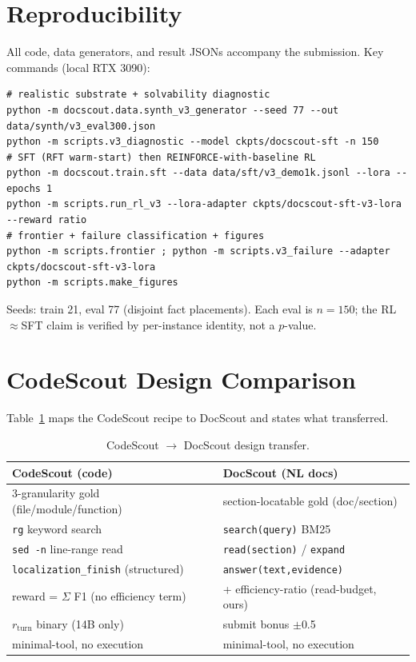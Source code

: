 \documentclass[10pt,twocolumn]{article}
\begin{document}
\section{Reproducibility}
\label{app:repro}
All code, data generators, and result JSONs accompany the submission. Key commands (local RTX 3090):
\begin{verbatim}
# realistic substrate + solvability diagnostic
python -m docscout.data.synth_v3_generator --seed 77 --out data/synth/v3_eval300.json
python -m scripts.v3_diagnostic --model ckpts/docscout-sft -n 150
# SFT (RFT warm-start) then REINFORCE-with-baseline RL
python -m docscout.train.sft --data data/sft/v3_demo1k.jsonl --lora --epochs 1
python -m scripts.run_rl_v3 --lora-adapter ckpts/docscout-sft-v3-lora --reward ratio
# frontier + failure classification + figures
python -m scripts.frontier ; python -m scripts.v3_failure --adapter ckpts/docscout-sft-v3-lora
python -m scripts.make_figures
\end{verbatim}
Seeds: train 21, eval 77 (disjoint fact placements). Each eval is $n{=}150$; the RL$\approx$SFT claim is verified by per-instance identity, not a $p$-value.

\section{CodeScout Design Comparison}
\label{app:codescout}
Table~\ref{tab:codescout} maps the CodeScout recipe to DocScout and states what transferred.
\begin{table}[h]
\centering\small
\caption{CodeScout $\to$ DocScout design transfer.}
\label{tab:codescout}
\begin{tabular}{p{}p{}}
\toprule
CodeScout (code) & DocScout (NL docs) \\
\midrule
3-granularity gold (file/module/function) & section-locatable gold (doc/section) \\
\texttt{rg} keyword search & \texttt{search(query)} BM25 \\
\texttt{sed -n} line-range read & \texttt{read(section)} / \texttt{expand} \\
\texttt{localization\_finish} (structured) & \texttt{answer(text,evidence)} \\
reward = $\Sigma$ F1 (no efficiency term) & + efficiency-ratio (read-budget, ours) \\
$r_{\text{turn}}$ binary (14B only) & submit bonus $\pm$0.5 \\
minimal-tool, no execution & minimal-tool, no execution \\
\bottomrule
\end{tabular}
\end{table}
\end{document}
